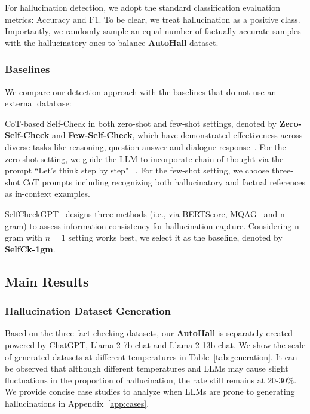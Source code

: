 For hallucination detection, we adopt the standard classification evaluation metrics: Accuracy and F1. %
To be clear, we treat hallucination as a positive class. Importantly, we randomly sample an equal number of factually accurate samples with the hallucinatory ones to balance \textbf{AutoHall} dataset.





\subsubsection{Baselines}
We compare our detection approach with the baselines that do not use an external database:

CoT-based Self-Check in both zero-shot and few-shot settings, denoted by \textbf{Zero-Self-Check} and \textbf{Few-Self-Check}, which have demonstrated effectiveness across diverse tasks like reasoning, question answer and dialogue response~\citep{madaan2023self-refine,xue2023rcot}. 
For the zero-shot setting, we guide the LLM to incorporate chain-of-thought via the prompt ``Let’s think step by step" ~\citep{kojima2022large}. 
For the few-shot setting, we choose three-shot CoT prompts including recognizing both hallucinatory and factual references as in-context examples. 

SelfCheckGPT~\citep{selfcheckgpt} designs three methods (i.e., via BERTScore, MQAG~\citep{manakul2023mqag} and n-gram) to assess information consistency for hallucination capture. Considering n-gram with $n=1$ setting works best, we select it as the baseline, denoted by \textbf{SelfCk-1gm}. 



\subsection{Main Results}
\subsubsection{Hallucination Dataset Generation}
Based on the three fact-checking datasets, our \textbf{AutoHall} is separately created powered by ChatGPT, Llama-2-7b-chat and Llama-2-13b-chat. We show the scale of generated datasets at different temperatures in Table~\ref{tab:generation}.
It can be observed that although different temperatures and LLMs may cause slight fluctuations in the proportion of hallucination, the rate still remains at 20-30\%. We provide concise case studies to analyze when LLMs are prone to generating hallucinations in Appendix~\ref{app:cases}. 


